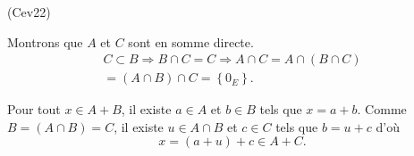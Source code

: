 \begin{tiny}(Cev22)\end{tiny}
Montrons que $A$ et $C$ sont en somme directe.
\begin{multline*}
 C \subset B \Rightarrow B \cap C = C \Rightarrow A \cap C = A \cap (B \cap C )\\
 = (A \cap B) \cap C = \left\lbrace 0_E \right\rbrace .
\end{multline*}

Pour tout $x\in A + B$, il existe $a\in A$ et $b \in B$ tels que $x = a + b$. Comme $B = (A\cap B) = C$,
il existe $u \in A\cap B$ et $c\in C$ tels que $b = u+c$ d'où
\[
 x = (a + u) + c \in A + C.
\]
